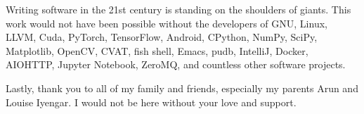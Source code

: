 \documentclass[12pt]{cmuthesis}
\begin{document}
\begin{acknowledgments}
  Writing software in the 21st century is standing on the shoulders of giants.
  This work would not have been possible without the developers of GNU, Linux,
  LLVM, Cuda, PyTorch, TensorFlow, Android, CPython, NumPy, SciPy, Matplotlib,
  OpenCV, CVAT, fish shell, Emacs, pudb, IntelliJ, Docker, AIOHTTP, Jupyter
  Notebook, ZeroMQ, and countless other software projects.

  Lastly, thank you to all of my family and friends,
  especially my parents Arun and Louise Iyengar.
  I would not be here without your love and support.
\end{acknowledgments}

\tableofcontents
\listoffigures
\listoftables
\mainmatter


%
%
%
%
%









\backmatter

\renewcommand{\bibsection}{\chapter{\bibname}}




\end{document}

